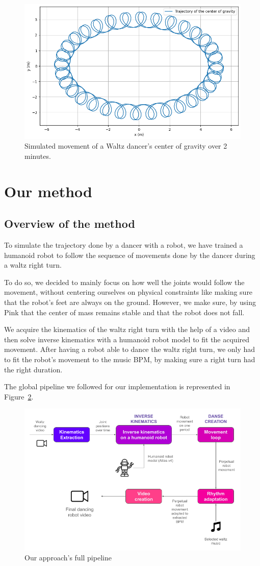 \documentclass{amsart}
\theoremstyle{definition}
\theoremstyle{plain}
\begin{document}
\begin{figure}
  \centering
  \includegraphics[width = 0.5 \columnwidth]{img/waltz_cog_movement.png} 
  \caption{Simulated movement of a Waltz dancer's center of gravity over 2 minutes.}\label{fig:cog_movement}
\end{figure}


\section{Our method}

\subsection{Overview of the method}
To simulate the trajectory done by a dancer with a robot, we have trained a humanoid robot to follow the sequence of movements done by the dancer during a waltz right turn.

To do so, we decided to mainly focus on how well the joints would follow the movement, without centering ourselves on physical constraints like making sure that the robot's feet are always on the ground.
However, we make sure, by using Pink \cite{pink2024} that the center of mass remains stable and that the robot does not fall.

We acquire the kinematics of the waltz right turn with the help of a video and then solve inverse kinematics with a humanoid robot model to fit the acquired movement. 
After having a robot able to dance the waltz right turn, we only had to fit the robot's movement to the music BPM, by making sure a right turn had the right duration.

The global pipeline we followed for our implementation is represented in Figure~\ref{fig:pipeline}.

\begin{figure}
  \includegraphics[width = 0.75 \columnwidth]{img/final_solution_pipeline.png}
  \caption{Our approach's full pipeline}\label{fig:pipeline}
\end{figure}
\end{document}
